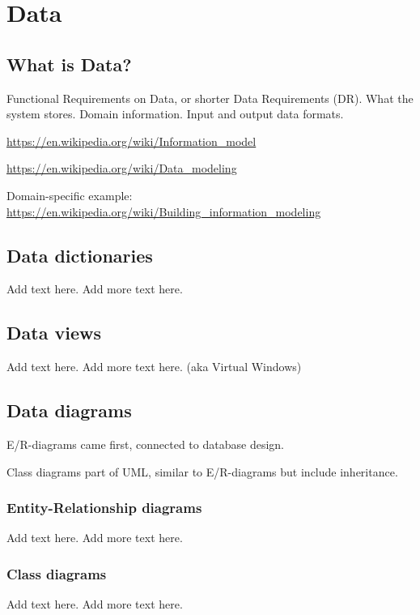 
\chapter{Data}%

\section{What is Data?}

Functional Requirements on Data, or shorter Data Requirements (DR). What the system stores. Domain information. Input and output data formats.

\url{https://en.wikipedia.org/wiki/Information_model}

\url{https://en.wikipedia.org/wiki/Data_modeling}

Domain-specific example:\\\url{https://en.wikipedia.org/wiki/Building_information_modeling}


\section{Data dictionaries}
Add text here. Add more text here.

\section{Data views}
Add text here. Add more text here.  (aka Virtual Windows)

\section{Data diagrams}

E/R-diagrams came first, connected to database design.

Class diagrams part of UML, similar to E/R-diagrams but include inheritance.

\subsection{Entity-Relationship diagrams}
Add text here. Add more text here.

\subsection{Class diagrams}
Add text here. Add more text here.


